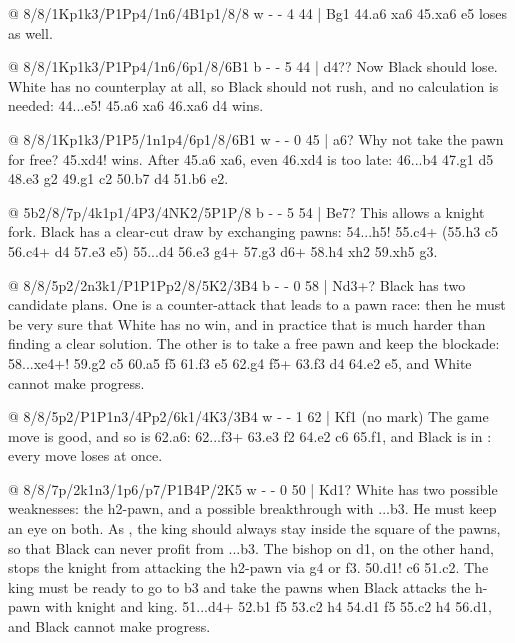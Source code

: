 @ 8/8/1Kp1k3/P1Pp4/1n6/4B1p1/8/8 w - - 4 44 | Bg1
44.a6 \N xa6 45.\K xa6 \K e5 loses as well.

@ 8/8/1Kp1k3/P1Pp4/1n6/6p1/8/6B1 b - - 5 44 | d4??
Now Black should lose. White has no counterplay at all, so Black should not
rush, and no calculation is needed: 44...\K e5! 45.a6 \N xa6 46.\K xa6
d4 wins.

@ 8/8/1Kp1k3/P1P5/1n1p4/6p1/8/6B1 w - - 0 45 | a6?
Why not take the pawn for free? 45.\B xd4! wins. After 45.a6 \N xa6, even 46.\B xd4 is too late:
46...\N b4 47.\B g1 \K d5 48.\B e3 g2 49.\B g1 \N c2 50.\K b7 \N d4 51.\K b6 \N e2.

@ 5b2/8/7p/4k1p1/4P3/4NK2/5P1P/8 b - - 5 54 | Be7?
This allows a knight fork. Black has a clear-cut draw by exchanging
pawns: 54...h5! 55.\N c4+ (55.h3 \B c5 56.\N c4+
\K d4 57.\N e3 \K e5) 55...\K d4 56.\N e3 g4+ 57.\K g3 \B d6+ 58.\K h4 \B xh2 59.\K xh5 g3.

@ 8/8/5p2/2n3k1/P1P1Pp2/8/5K2/3B4 b - - 0 58 | Nd3+?
Black has two candidate plans. One is a counter-attack that leads to a pawn race: then he must be
very sure that White has no win, and in practice that is much harder than finding a clear solution.
The other is to take a free pawn and keep the blockade:
58...\N xe4+! 59.\K g2 \N c5 60.a5 \K f5 61.\K f3 \K e5 62.\K g4 f5+ 63.\K f3 \K d4 64.\B e2 \K e5,
and White cannot make progress.

@ 8/8/5p2/P1P1n3/4Pp2/6k1/4K3/3B4 w - - 1 62 | Kf1 (no mark)
The game move is good, and so is 62.a6: 62...f3+ 63.\K e3 f2 64.\B e2 \N c6 65.\B f1, and Black is in
: every move loses at once.

@ 8/8/7p/2k1n3/1p6/p7/P1B4P/2K5 w - - 0 50 | Kd1?
White has two possible weaknesses: the h2-pawn, and a possible breakthrough with ...b3.
He must keep an eye on both. As , the king should
always stay inside the square of the pawns, so that
Black can never profit from ...b3. The bishop on d1, on the other hand, stops the knight from
attacking the h2-pawn via g4 or f3. 50.\B d1! \N c6 51.\K c2. The king must be ready to go to b3
and take the pawns when Black attacks the h-pawn with knight and king. 51...\N d4+ 52.\K b1 \N f5
53.\B c2 \N h4 54.\B d1 \N f5 55.\B c2 \N h4 56.\B d1, and Black cannot make progress.

